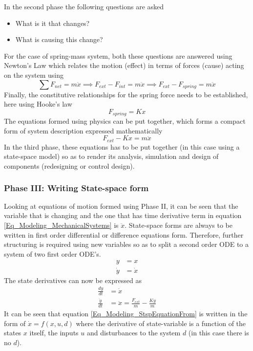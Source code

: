 In the second phase the following questions are asked
\begin{itemize}
	\item What is it that changes?
	\item What is causing this change?
\end{itemize}
For the case of spring-mass system, both these questions are answered using Newton's Law which relates the motion (effect) in terms of forces (cause) acting on the system using
\begin{equation}
	\sum F_{net} = m \ddot{x} \implies F_{ext} - F_{int} = m \ddot{x} \implies  F_{ext} - F_{spring} = m \ddot{x}
\end{equation}
Finally, the constitutive relationships for the spring force needs to be established, here using Hooke's law
\begin{equation}
	F_{spring} = K x
\end{equation}
The equations formed using physics can be put together, which forms a compact form of system description expressed mathematically
\begin{equation} \label{Eq_Modeling_MechanicalSystems}
	F_{ext} - K x = m \ddot{x}
\end{equation}
In the third phase, these equations has to be put together (in this case using a state-space model) so as to render its analysis, simulation and design of components (redesigning or control design).

\subsubsection{Phase III: Writing State-space form}

Looking at equations of motion formed using Phase II, it can be seen that the variable that is changing and the one that has time derivative term in equation \eqref{Eq_Modeling_MechanicalSystems} is $\ddot{x}$. State-space forms are always to be written in first order differential or difference equations form. Therefore, further structuring is required using new variables so as to split a second order ODE to a system of two first order ODE's.
\begin{align}
	y &= x \\
	\dot{y} &= \dot{x}
\end{align}
The state derivatives can now be expressed as
\begin{align}
	\frac{dy}{dt} &= \dot{x} \\
	\frac{\dot{y}}{dt} &= \ddot{x} = \frac{F_{ext}}{m} - \frac{Ky}{m} \label{Eq_Modeling_StspEquationFrom}
\end{align}
It can be seen that equation \eqref{Eq_Modeling_StspEquationFrom} is written in the form of $\dot{x} = f(x,u,d)$ where the derivative of state-variable is a function of the states $x$ itself, the inputs $u$ and disturbances to the system $d$ (in this case there is no $d$).

